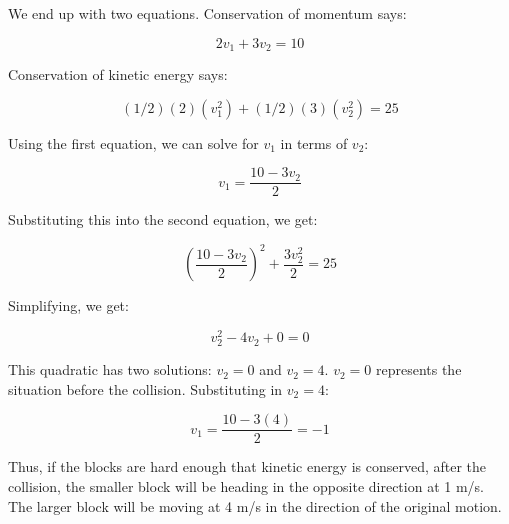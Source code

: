 We end up with two equations. Conservation of momentum says:

$$2 v_1 + 3 v_2 = 10$$

Conservation of kinetic energy says:

$$(1/2)(2)(v_1^2) + (1/2)(3)(v_2^2) = 25$$

Using the first equation, we can solve for $v_1$ in terms of $v_2$:

$$v_1 = \frac{10 - 3 v_2}{2}$$

Substituting this into the second equation, we get:

$$\left(\frac{10 - 3 v_2}{2}\right)^2 + \frac{3 v_2^2}{2} = 25$$

Simplifying, we get:

$$v_2^2 - 4 v_2 + 0 = 0$$

This quadratic has two solutions: $v_2 = 0$ and $v_2 = 4$.  $v_2 = 0$
represents the situation before the collision.  Substituting in $v_2 = 4$:

$$v_1 = \frac{10 - 3(4)}{2} = -1$$

Thus, if the blocks are hard enough that kinetic energy is conserved,
after the collision, the smaller block will be heading in the opposite
direction at 1 m/s.  The larger block will be moving at 4 m/s in the
direction of the original motion.


